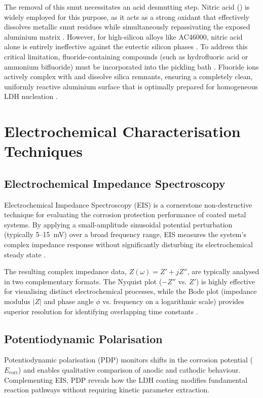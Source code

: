 \documentclass[11pt,twoside,a4paper,final]{report}
\begin{document}
The removal of this smut necessitates an acid desmutting step. Nitric acid () is widely employed for this purpose, as it acts as a strong oxidant that effectively dissolves metallic smut residues while simultaneously repassivating the exposed aluminium matrix \cite{Jin2020}. However, for high-silicon alloys like AC46000, nitric acid alone is entirely ineffective against the eutectic silicon phases \cite{ASM1994}. To address this critical limitation, fluoride-containing compounds (such as hydrofluoric acid or ammonium bifluoride) must be incorporated into the pickling bath \cite{Askin1995, Lee2008}. Fluoride ions actively complex with and dissolve silica remnants, ensuring a completely clean, uniformly reactive aluminium surface that is optimally prepared for homogeneous LDH nucleation \cite{Askin1995, Lee2008}.

\section{Electrochemical Characterisation Techniques}
\label{sec:electrochemical_techniques}

\subsection{Electrochemical Impedance Spectroscopy}
\label{subsec:EIS}

Electrochemical Impedance Spectroscopy (EIS) is a cornerstone non-destructive technique for evaluating the corrosion protection performance of coated metal systems. By applying a small-amplitude sinusoidal potential perturbation (typically 5--15~mV) over a broad frequency range, EIS measures the system's complex impedance response without significantly disturbing its electrochemical steady state \cite{Orazem2008, Barsoukov2005, Lasia2014}.

The resulting complex impedance data, $Z(\omega) = Z' + jZ''$, are typically analysed in two complementary formats. The Nyquist plot ($-Z''$ vs. $Z'$) is highly effective for visualising distinct electrochemical processes, while the Bode plot (impedance modulus $|Z|$ and phase angle $\phi$ vs. frequency on a logarithmic scale) provides superior resolution for identifying overlapping time constants \cite{Orazem2008, Lasia2014}. 

\subsection{Potentiodynamic Polarisation}
Potentiodynamic polarisation (PDP) monitors shifts in the corrosion potential ($E_{\text{corr}}$) and enables qualitative comparison of anodic and cathodic behaviour. Complementing EIS, PDP reveals how the LDH coating modifies fundamental reaction pathways without requiring kinetic parameter extraction.
\end{document}
